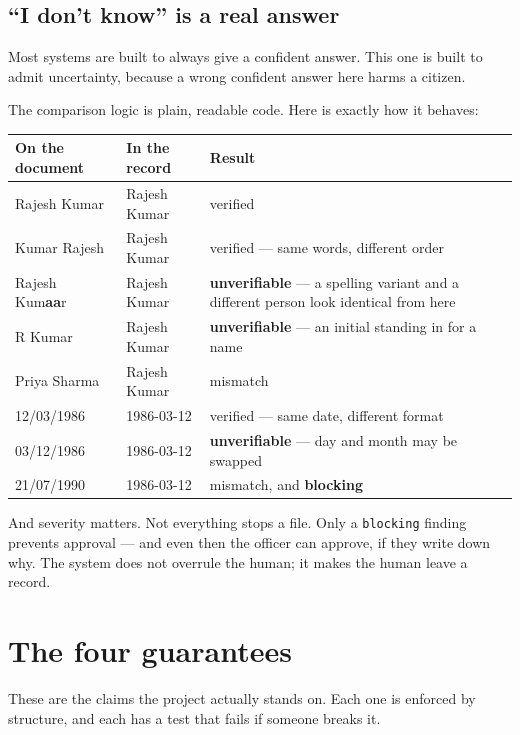 \documentclass[11pt,a4paper]{article}
\begin{document}
\subsection{``I don't know'' is a real answer}

Most systems are built to always give a confident answer. This one is built to
admit uncertainty, because a wrong confident answer here harms a citizen.

The comparison logic is plain, readable code. Here is exactly how it behaves:

\begin{longtable}{@{}p{3.6cm}p{3.4cm}p{7.4cm}@{}}
\toprule
\textbf{On the document} & \textbf{In the record} & \textbf{Result} \\
\midrule
\endhead
Rajesh Kumar & Rajesh Kumar & verified \\
Kumar Rajesh & Rajesh Kumar & verified --- same words, different order \\
Rajesh Kum\textbf{aa}r & Rajesh Kumar & \textbf{unverifiable} --- a spelling
variant and a different person look identical from here \\
R Kumar & Rajesh Kumar & \textbf{unverifiable} --- an initial standing in for a
name \\
Priya Sharma & Rajesh Kumar & mismatch \\
12/03/1986 & 1986-03-12 & verified --- same date, different format \\
03/12/1986 & 1986-03-12 & \textbf{unverifiable} --- day and month may be swapped \\
21/07/1990 & 1986-03-12 & mismatch, and \textbf{blocking} \\
\bottomrule
\end{longtable}

And severity matters. Not everything stops a file. Only a \texttt{blocking}
finding prevents approval --- and even then the officer can approve, if they
write down why. The system does not overrule the human; it makes the human
leave a record.

\newpage

\section{The four guarantees}
\label{sec:security}

These are the claims the project actually stands on. Each one is enforced by
structure, and each has a test that fails if someone breaks it.
\end{document}
